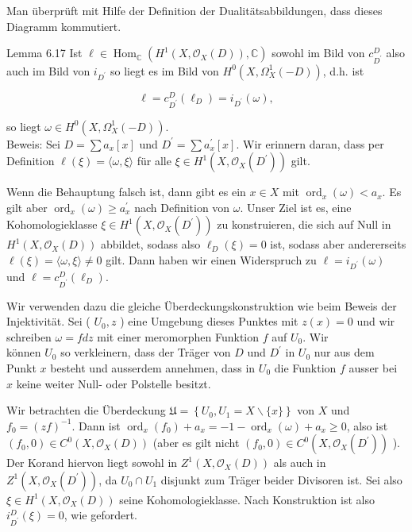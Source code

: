 \documentclass[10pt, letterpaper]{article}
\begin{document}
Man überprüft mit Hilfe der Definition der Dualitätsabbildungen, dass dieses Diagramm kommutiert.

Lemma 6.17 Ist $\ell \in \operatorname{Hom}_{\mathbb{C}}\left(H^{1}\left(X, \mathcal{O}_{X}(D)\right), \mathbb{C}\right)$ sowohl im Bild von $c_{D^{\prime}}^{D}$ also auch im Bild von $i_{D^{\prime}}$ so liegt es im Bild von $H^{0}\left(X, \Omega_{X}^{1}(-D)\right)$, d.h. ist

$$
\ell=c_{D^{\prime}}^{D}\left(\ell_{D}\right)=i_{D^{\prime}}(\omega),
$$

so liegt $\omega \in H^{0}\left(X, \Omega_{X}^{1}(-D)\right)$.\\
Beweis: Sei $D=\sum a_{x}[x]$ und $D^{\prime}=\sum a_{x}^{\prime}[x]$. Wir erinnern daran, dass per Definition $\ell(\xi)=\langle\omega, \xi\rangle$ für alle $\xi \in H^{1}\left(X, \mathcal{O}_{X}\left(D^{\prime}\right)\right)$ gilt.

Wenn die Behauptung falsch ist, dann gibt es ein $x \in X$ mit $\operatorname{ord}_{x}(\omega)< a_{x}$. Es gilt aber $\operatorname{ord}_{x}(\omega) \geq a_{x}^{\prime}$ nach Definition von $\omega$. Unser Ziel ist es, eine Kohomologieklasse $\xi \in H^{1}\left(X, \mathcal{O}_{X}\left(D^{\prime}\right)\right)$ zu konstruieren, die sich auf Null in $H^{1}\left(X, \mathcal{O}_{X}(D)\right)$ abbildet, sodass also $\ell_{D}(\xi)=0$ ist, sodass aber andererseits $\ell(\xi)=\langle\omega, \xi\rangle \neq 0$ gilt. Dann haben wir einen Widerspruch zu $\ell=i_{D^{\prime}}(\omega)$ und $\ell=c_{D^{\prime}}^{D}\left(\ell_{D}\right)$.

Wir verwenden dazu die gleiche Überdeckungskonstruktion wie beim Beweis der Injektivität. Sei ( $U_{0}, z$ ) eine Umgebung dieses Punktes mit $z(x)=0$ und wir schreiben $\omega=f d z$ mit einer meromorphen Funktion $f$ auf $U_{0}$. Wir\\
können $U_{0}$ so verkleinern, dass der Träger von $D$ und $D^{\prime}$ in $U_{0}$ nur aus dem Punkt $x$ besteht und ausserdem annehmen, dass in $U_{0}$ die Funktion $f$ ausser bei $x$ keine weiter Null- oder Polstelle besitzt.

Wir betrachten die Überdeckung $\mathfrak{U}=\left\{U_{0}, U_{1}=X \backslash\{x\}\right\}$ von $X$ und $f_{0}=(z f)^{-1}$. Dann ist $\operatorname{ord}_{x}\left(f_{0}\right)+a_{x}=-1-\operatorname{ord}_{x}(\omega)+a_{x} \geq 0$, also ist $\left(f_{0}, 0\right) \in C^{0}\left(X, \mathcal{O}_{X}(D)\right)$ (aber es gilt nicht $\left(f_{0}, 0\right) \in C^{0}\left(X, \mathcal{O}_{X}\left(D^{\prime}\right)\right)$ ). Der Korand hiervon liegt sowohl in $Z^{1}\left(X, \mathcal{O}_{X}(D)\right)$ als auch in $Z^{1}\left(X, \mathcal{O}_{X}\left(D^{\prime}\right)\right)$, da $U_{0} \cap U_{1}$ disjunkt zum Träger beider Divisoren ist. Sei also $\xi \in H^{1}\left(X, \mathcal{O}_{X}(D)\right)$ seine Kohomologieklasse. Nach Konstruktion ist also $i_{D^{\prime}}^{D}(\xi)=0$, wie gefordert.
\end{document}
